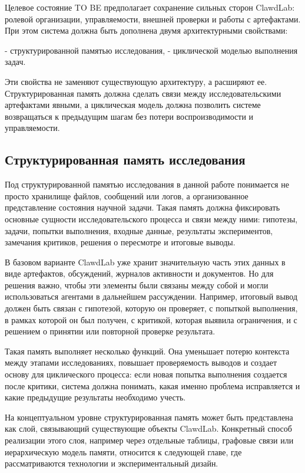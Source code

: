 Целевое состояние TO BE предполагает сохранение сильных сторон ClawdLab: ролевой организации, управляемости, внешней проверки и работы с артефактами. При этом система должна быть дополнена двумя архитектурными свойствами:

- структурированной памятью исследования,
- циклической моделью выполнения задач.

Эти свойства не заменяют существующую архитектуру, а расширяют ее. Структурированная память должна сделать связи между исследовательскими артефактами явными, а циклическая модель должна позволить системе возвращаться к предыдущим шагам без потери воспроизводимости и управляемости.

\subsection{Структурированная память исследования}

Под структурированной памятью исследования в данной работе понимается не просто хранилище файлов, сообщений или логов, а организованное представление состояния научной задачи. Такая память должна фиксировать основные сущности исследовательского процесса и связи между ними: гипотезы, задачи, попытки выполнения, входные данные, результаты экспериментов, замечания критиков, решения о пересмотре и итоговые выводы.

В базовом варианте ClawdLab уже хранит значительную часть этих данных в виде артефактов, обсуждений, журналов активности и документов. Но для решения важно, чтобы эти элементы были связаны между собой и могли использоваться агентами в дальнейшем рассуждении. Например, итоговый вывод должен быть связан с гипотезой, которую он проверяет, с попыткой выполнения, в рамках которой он был получен, с критикой, которая выявила ограничения, и с решением о принятии или повторной проверке результата.

Такая память выполняет несколько функций. Она уменьшает потерю контекста между этапами исследованиях,  повышает проверяемость выводов и создает основу для циклического процесса: если новая попытка выполнения создается после критики, система должна понимать, какая именно проблема исправляется и какие предыдущие результаты необходимо учесть.

На концептуальном уровне структурированная память может быть представлена как слой, связывающий существующие объекты ClawdLab. Конкретный способ реализации этого слоя, например через отдельные таблицы, графовые связи или иерархическую модель памяти, относится к следующей главе, где рассматриваются технологии и экспериментальный дизайн.


